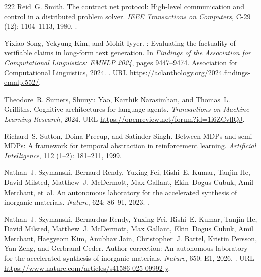 \begin{thebibliography}{222}
Reid~G. Smith.
\newblock The contract net protocol: High-level communication and control in a
  distributed problem solver.
\newblock \emph{IEEE Transactions on Computers}, C-29 (12):
  1104--1113, 1980.
\newblock {}.

Yixiao Song, Yekyung Kim, and Mohit Iyyer.
: Evaluating the factuality of verifiable claims in
  long-form text generation.
\newblock In \emph{Findings of the Association for Computational Linguistics:
  EMNLP 2024}, pages 9447--9474. Association for Computational Linguistics,
  2024.
\newblock {}.
\newblock URL \url{https://aclanthology.org/2024.findings-emnlp.552/}.

Theodore~R. Sumers, Shunyu Yao, Karthik Narasimhan, and Thomas~L. Griffiths.
\newblock Cognitive architectures for language agents.
\newblock \emph{Transactions on Machine Learning Research}, 2024.
\newblock URL \url{https://openreview.net/forum?id=1i6ZCvflQJ}.

Richard~S. Sutton, Doina Precup, and Satinder Singh.
\newblock Between {MDPs} and semi-{MDPs}: A framework for temporal abstraction
  in reinforcement learning.
\newblock \emph{Artificial Intelligence}, 112 (1--2):
  181--211, 1999.

Nathan~J. Szymanski, Bernard Rendy, Yuxing Fei, Rishi~E. Kumar, Tanjin He,
  David Milsted, Matthew~J. McDermott, Max Gallant, Ekin~Dogus Cubuk, Amil
  Merchant, et~al.
\newblock An autonomous laboratory for the accelerated synthesis of inorganic
  materials.
\newblock \emph{Nature}, 624: 86--91, 2023.
\newblock {}.

Nathan~J. Szymanski, Bernardus Rendy, Yuxing Fei, Rishi~E. Kumar, Tanjin He,
  David Milsted, Matthew~J. McDermott, Max Gallant, Ekin~Dogus Cubuk, Amil
  Merchant, Haegyeom Kim, Anubhav Jain, Christopher~J. Bartel, Kristin Persson,
  Yan Zeng, and Gerbrand Ceder.
\newblock Author correction: An autonomous laboratory for the accelerated
  synthesis of inorganic materials.
\newblock \emph{Nature}, 650: E1, 2026.
\newblock {}.
\newblock URL \url{https://www.nature.com/articles/s41586-025-09992-y}.


\end{thebibliography}

